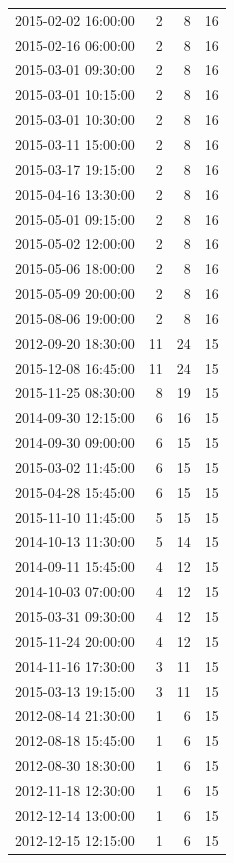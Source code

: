 \begin{tabular}{lrrr}
2015-02-02 16:00:00 & 2 & 8 & 16 \\
2015-02-16 06:00:00 & 2 & 8 & 16 \\
2015-03-01 09:30:00 & 2 & 8 & 16 \\
2015-03-01 10:15:00 & 2 & 8 & 16 \\
2015-03-01 10:30:00 & 2 & 8 & 16 \\
2015-03-11 15:00:00 & 2 & 8 & 16 \\
2015-03-17 19:15:00 & 2 & 8 & 16 \\
2015-04-16 13:30:00 & 2 & 8 & 16 \\
2015-05-01 09:15:00 & 2 & 8 & 16 \\
2015-05-02 12:00:00 & 2 & 8 & 16 \\
2015-05-06 18:00:00 & 2 & 8 & 16 \\
2015-05-09 20:00:00 & 2 & 8 & 16 \\
2015-08-06 19:00:00 & 2 & 8 & 16 \\
2012-09-20 18:30:00 & 11 & 24 & 15 \\
2015-12-08 16:45:00 & 11 & 24 & 15 \\
2015-11-25 08:30:00 & 8 & 19 & 15 \\
2014-09-30 12:15:00 & 6 & 16 & 15 \\
2014-09-30 09:00:00 & 6 & 15 & 15 \\
2015-03-02 11:45:00 & 6 & 15 & 15 \\
2015-04-28 15:45:00 & 6 & 15 & 15 \\
2015-11-10 11:45:00 & 5 & 15 & 15 \\
2014-10-13 11:30:00 & 5 & 14 & 15 \\
2014-09-11 15:45:00 & 4 & 12 & 15 \\
2014-10-03 07:00:00 & 4 & 12 & 15 \\
2015-03-31 09:30:00 & 4 & 12 & 15 \\
2015-11-24 20:00:00 & 4 & 12 & 15 \\
2014-11-16 17:30:00 & 3 & 11 & 15 \\
2015-03-13 19:15:00 & 3 & 11 & 15 \\
2012-08-14 21:30:00 & 1 & 6 & 15 \\
2012-08-18 15:45:00 & 1 & 6 & 15 \\
2012-08-30 18:30:00 & 1 & 6 & 15 \\
2012-11-18 12:30:00 & 1 & 6 & 15 \\
2012-12-14 13:00:00 & 1 & 6 & 15 \\
2012-12-15 12:15:00 & 1 & 6 & 15 \\

\end{tabular}

